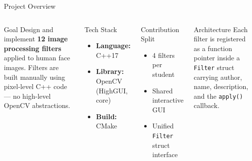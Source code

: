 \documentclass[aspectratio=169]{beamer}
\begin{document}
\begin{frame}{Project Overview}
  \begin{columns}[T]
      \begin{block}{Goal}
        Design and implement \textbf{12 image processing filters} applied to human face images. Filters are built manually using pixel-level C++ code — no high-level OpenCV abstractions.
      \end{block}
      \vspace{0.4cm}
      \begin{block}{Tech Stack}
        \begin{itemize}
          \item \textbf{Language:} C++17
          \item \textbf{Library:} OpenCV (HighGUI, core)
          \item \textbf{Build:} CMake
        \end{itemize}
      \end{block}
      \begin{block}{Contribution Split}
        \begin{itemize}
          \item 4 filters per student
          \item Shared interactive GUI
          \item Unified \texttt{Filter} struct interface
        \end{itemize}
      \end{block}
      \vspace{0.4cm}
      \begin{block}{Architecture}
        Each filter is registered as a function pointer inside a \texttt{Filter} struct carrying author, name, description, and the \texttt{apply()} callback.
      \end{block}
  \end{columns}
\end{frame}
\end{document}
